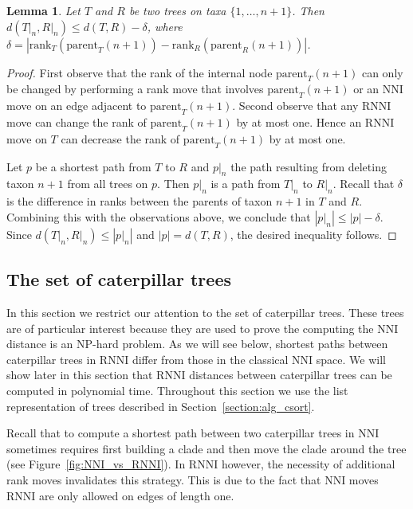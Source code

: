 \documentclass{amsart}
\newcommand{\parent}{\mathrm{parent}}
\newcommand{\rank}{\mathrm{rank}}
\newcommand{\nni}{\mathrm{NNI}}
\newcommand{\rnni}{\mathrm{RNNI}}
\newtheorem{lemma}[definition]{Lemma}
\begin{document}
\begin{lemma}
Let $T$ and $R$ be two trees on taxa $\{1, \ldots, n+1\}$.
Then $d(T{\big|}_n, R{\big|}_n) \leq d(T,R) - \delta$, where $\delta = |\rank_T(\parent_T(n+1)) - \rank_R(\parent_R(n+1))|$.
\label{lemma:distance_delete_taxon}
\end{lemma}

\begin{proof}
First observe that the rank of the internal node $\parent_T(n+1)$ can only be changed by performing a rank move that involves $\parent_T(n+1)$ or an $\nni$ move on an edge adjacent to $\parent_T(n+1)$.
Second observe that any $\rnni$ move can change the rank of $\parent_T(n+1)$ by at most one.
Hence an $\rnni$ move on $T$ can decrease the rank of $\parent_T(n+1)$ by at most one.

Let $p$ be a shortest path from $T$ to $R$ and $p{\big|}_n$ the path resulting from deleting taxon $n+1$ from all trees on $p$.
Then $p{\big|}_n$ is a path from $T{\big|}_n$ to $R{\big|}_n$.
Recall that $\delta$ is the difference in ranks between the parents of taxon $n+1$ in $T$ and $R$.
Combining this with the observations above, we conclude that $|p{\big|}_n| \leq |p| - \delta$.
Since $d(T{\big|}_n,R{\big|}_n) \leq |p{\big|}_n|$ and $|p| = d(T,R)$, the desired inequality follows.
\end{proof}


\subsection{The set of caterpillar trees}
\label{section:caterpillar_convex}

In this section we restrict our attention to the set of caterpillar trees.
These trees are of particular interest because they are used to prove the computing the $\nni$ distance is an NP-hard problem.
As we will see below, shortest paths between caterpillar trees in $\rnni$ differ from those in the classical $\nni$ space.
We will show later in this section that $\rnni$ distances between caterpillar trees can be computed in polynomial time.
Throughout this section we use the list representation of trees described in Section~\ref{section:alg_csort}.

Recall \autocite{Gavryushkin2018-ol} that to compute a shortest path between two caterpillar trees in $\nni$ sometimes requires first building a clade and then move the clade around the tree (see Figure~\ref{fig:NNI_vs_RNNI}).
In $\rnni$ however, the necessity of additional rank moves invalidates this strategy.
This is due to the fact that $\nni$ moves $\rnni$ are only allowed on edges of length one.
\end{document}
